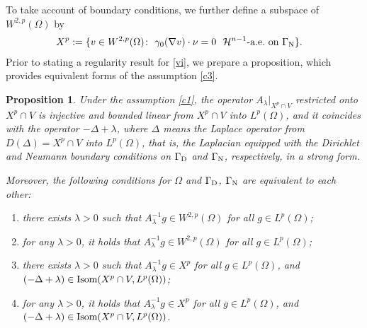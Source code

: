 \documentclass[reqno,10pt]{amsart}
\newtheorem{Prop}[Th]{Proposition}
\begin{document}
To take account of boundary conditions, we further define a subspace of
$W^{2,p}(\Omega)$ by 
\begin{align*}
X^p&:=\{v\in W^{2,p}(\Omega) \colon \ \gamma_0(\nabla v) \cdot \nu =0 \ \
 {{\mathcal H}}^{n-1}\mbox{-a.e.~on } {{\Gamma_{\rm\scriptsize N}}}\}.
\end{align*}
Prior to stating a regularity result for \eqref{vi}, we prepare a
proposition, which provides equivalent forms of the assumption \eqref{c3}.

\begin{Prop}\label{prop-GammaD}
Under the assumption \eqref{c1}, the operator $A_\lambda|_{X^p \cap V}$
 restricted onto $X^p \cap V$ is injective and bounded linear from
 $X^p \cap V$ into $L^p(\Omega)$, and it coincides with the operator $-\Delta +
 \lambda$, where $\Delta$ means the Laplace operator from $D(\Delta) =
 X^p \cap V$ into $L^p(\Omega)$, that is, the Laplacian equipped with
 the Dirichlet and Neumann boundary conditions on ${{\Gamma_{\rm\scriptsize D}}}$ and
 ${{\Gamma_{\rm\scriptsize N}}}$, respectively, in a strong form.

Moreover, the following conditions for $\Omega$ and ${{\Gamma_{\rm\scriptsize D}}}$, ${{\Gamma_{\rm\scriptsize N}}}$ 
are equivalent to each other\/{\rm :}
\begin{enumerate}[{\rm (i)}]
\item
there exists 
$\lambda > 0$ such that 
$A_\lambda ^{-1}g\in W^{2,p}(\Omega)$  for all $g\in
     L^p(\Omega)$\/{\rm ;}
\item
for any $\lambda > 0$, it holds that $A_\lambda ^{-1}g\in W^{2,p}(\Omega)$
for all $g\in L^p(\Omega)$\/{\rm ;}
\item
there exists $\lambda > 0$ such that $A_\lambda^{-1} g \in X^p$ for all
	     $g \in L^p(\Omega)$, and $(-\Delta +\lambda) \in {\mbox{\rm Isom}}
	     (X^p\cap V,L^p(\Omega))$\/{\rm ;}
\item
for any $\lambda > 0$, it holds that $A_\lambda^{-1} g \in X^p$ for all
	     $g \in L^p(\Omega)$, and
$(-\Delta +\lambda) \in {\mbox{\rm Isom}} (X^p\cap V,L^p(\Omega))$.
\end{enumerate}
\end{Prop}
\end{document}
